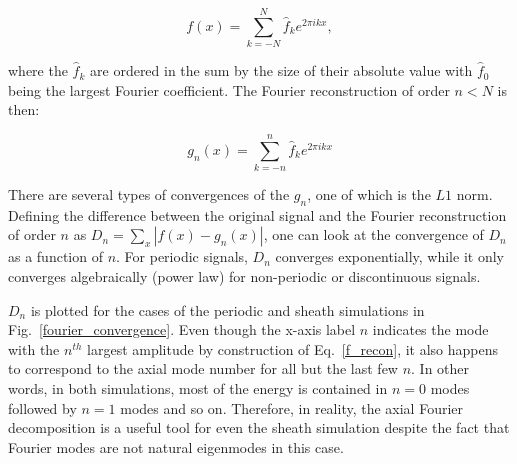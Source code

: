 \documentclass[showpacs,preprintnumbers,amsmath,amssymb,superscriptaddress,aip]{revtex4-1}
\def\beq{\begin{equation}}
\def\eeq{\end{equation}}
\begin{document}
\beq
\label{f_decomp}
f(x) = \sum_{k=-N}^{N} \hat{f}_k e^{2 \pi i k x},
\eeq

where the $\hat{f}_k$ are ordered in the sum by the size of their absolute value with $\hat{f}_0$ being the largest Fourier coefficient. The Fourier reconstruction of order $n<N$ is then:

\beq
\label{f_recon}
g_n(x) = \sum_{k=-n}^{n} \hat{f}_k e^{2 \pi i k x}
\eeq

There are several types of convergences of the $g_n$, one of which is the $L1$ norm. Defining the difference between the original signal and the Fourier reconstruction of order $n$ as
$D_n = \sum_x |f(x) - g_n(x)|$, one can look at the convergence of $D_n$ as a function of $n$. For periodic signals, $D_n$ converges exponentially, while it only converges algebraically
(power law) for non-periodic or discontinuous signals. 

$D_n$ is plotted for the cases of the periodic and sheath simulations in Fig.~\ref{fourier_convergence}. Even though the x-axis label $n$ indicates the mode with the $n^{th}$ largest amplitude
by construction of Eq.~\ref{f_recon}, it also happens to correspond to the axial mode number for all but the last few $n$. In other words, in both simulations, most of the energy is contained
in $n=0$ modes followed by $n=1$ modes and so on. Therefore, in reality, the axial Fourier decomposition is a useful tool for even the sheath simulation despite the fact that Fourier
modes are not natural eigenmodes in this case.




\end{document}
